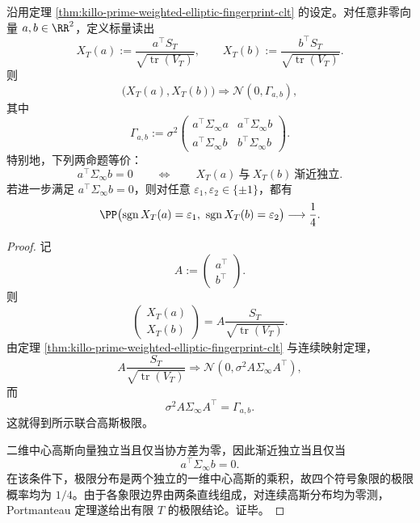 \begin{theorem}\label{thm:xi-time-part61aca-primeweighted-sigma-orthogonal-independence}
沿用定理 \ref{thm:killo-prime-weighted-elliptic-fingerprint-clt} 的设定。对任意非零向量 \(a,b\in\RR^2\)，定义标量读出
\[
X_T(a):=\frac{a^\top S_T}{\sqrt{\operatorname{tr}(V_T)}},
\qquad
X_T(b):=\frac{b^\top S_T}{\sqrt{\operatorname{tr}(V_T)}}.
\]
则
\[
\bigl(X_T(a),X_T(b)\bigr)
\Longrightarrow
\mathcal N(0,\Gamma_{a,b}),
\]
其中
\[
\Gamma_{a,b}
:=
\sigma^2
\begin{pmatrix}
a^\top\Sigma_\infty a & a^\top\Sigma_\infty b\\
a^\top\Sigma_\infty b & b^\top\Sigma_\infty b
\end{pmatrix}.
\]
特别地，下列两命题等价：
\[
a^\top\Sigma_\infty b=0
\qquad\Longleftrightarrow\qquad
X_T(a)\ \text{与}\ X_T(b)\ \text{渐近独立}.
\]
若进一步满足 \(a^\top\Sigma_\infty b=0\)，则对任意 \(\varepsilon_1,\varepsilon_2\in\{\pm1\}\)，都有
\[
\PP\bigl(\operatorname{sgn}X_T(a)=\varepsilon_1,\ \operatorname{sgn}X_T(b)=\varepsilon_2\bigr)
\longrightarrow
\frac14.
\]
\end{theorem}
\begin{proof}
记
\[
A:=
\begin{pmatrix}
a^\top\\
b^\top
\end{pmatrix}.
\]
则
\[
\begin{pmatrix}
X_T(a)\\
X_T(b)
\end{pmatrix}
=
A\frac{S_T}{\sqrt{\operatorname{tr}(V_T)}}.
\]
由定理 \ref{thm:killo-prime-weighted-elliptic-fingerprint-clt} 与连续映射定理，
\[
A\frac{S_T}{\sqrt{\operatorname{tr}(V_T)}}
\Longrightarrow
\mathcal N(0,\sigma^2A\Sigma_\infty A^\top),
\]
而
\[
\sigma^2A\Sigma_\infty A^\top=\Gamma_{a,b}.
\]
这就得到所示联合高斯极限。

二维中心高斯向量独立当且仅当协方差为零，因此渐近独立当且仅当
\[
a^\top\Sigma_\infty b=0.
\]
在该条件下，极限分布是两个独立的一维中心高斯的乘积，故四个符号象限的极限概率均为 \(1/4\)。由于各象限边界由两条直线组成，对连续高斯分布均为零测，Portmanteau 定理遂给出有限 \(T\) 的极限结论。证毕。
\end{proof}

